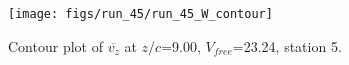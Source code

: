 \begin{figure}[H]
\centering
\texttt{[image: figs/run\_45/run\_45\_W\_contour]}
\caption{Contour plot of $\overline{v_{z}}$ at $z/c$=9.00, $V_{free}$=23.24, station 5.}
\label{fig:run_45_W_contour}
\end{figure}


